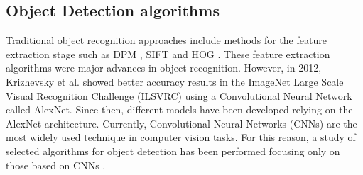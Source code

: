 
\subsection{Object Detection algorithms}
\label{sec:objectDetectionAlgorithms}

Traditional object recognition approaches include methods for the feature extraction stage such as DPM \cite{pedro2010dpm}, SIFT \cite{lowe2004sift} and HOG \cite{dalal2005hog}. These feature extraction algorithms were major advances in object recognition. However, in 2012, Krizhevsky et al. \cite{alex2012alexnet} showed better accuracy results in the ImageNet Large Scale Visual Recognition Challenge (ILSVRC) using a Convolutional Neural Network called AlexNet. Since then, different models have been developed relying on the AlexNet architecture. Currently, Convolutional Neural Networks (CNNs) are the most widely used technique in computer vision tasks. For this reason, a study of selected algorithms for object detection has been performed focusing only on those based on CNNs \cite{juli2020}.

